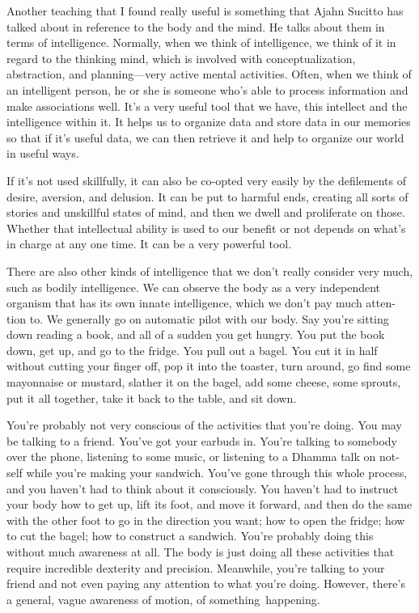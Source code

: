 Another teaching that I found really useful is something that Ajahn Sucitto has talked about in reference to the body and the mind. He talks about them in terms of intelligence. Normally, when we think of intelligence, we think of it in regard to the thinking mind, which is involved with conceptualization, abstraction, and planning---very active mental activities. Often, when we think of an intelligent person, he or she is someone who's able to process information and make associations well. It's a very useful tool that we have, this intellect and the intelligence within it. It helps us to organize data and store data in our memories so that if it's useful data, we can then retrieve it and help to organize our world in useful ways.

\enlargethispage{1\baselineskip}
If it's not used skillfully, it can also be co-opted very easily by the defilements of desire, aversion, and delusion. It can be put to harmful ends, creating all sorts of stories and unskillful states of mind, and then we dwell and proliferate on those. Whether that intellectual ability is used to our benefit or not depends on what's in charge at any one time. It can be a very powerful tool.

There are also other kinds of intelligence that we don't really consider very much, such as bodily intelligence. We can observe the body as a very independent organism that has its own innate intelligence, which we don't pay much atten- \linebreak tion to. We generally go on automatic pilot with our body. \linebreak Say you're sitting down reading a book, and all of a sudden you get hungry. You put the book down, get up, and go to \linebreak the fridge. You pull out a bagel. You cut it in half without cutting your finger off, pop it into the toaster, turn around, go find some mayonnaise or mustard, slather it on the bagel, \linebreak add some cheese, some sprouts, put it all together, take it back to the table, and sit down.

You're probably not very conscious of the activities \linebreak that you're doing. You may be talking to a friend. You've got your earbuds in. You're talking to somebody over the phone, lis\-tening to some music, or listening to a Dhamma talk on not-self while you're making your sandwich. You've gone through this whole process, and you haven't had to think about it consciously. You haven't had to instruct your body how to get up, lift its foot, and move it forward, and then do the same with the other foot to go in the direction you want; how to open the fridge; how to cut the bagel; how to construct a sandwich. You're probably doing this without much awareness at all. The body is \linebreak just doing all these activities that require incredible dexterity and precision. Meanwhile, you're talking to your friend and not even paying any attention to what you're doing. However, there's a general, vague awareness of motion, of \mbox{something happening.}

